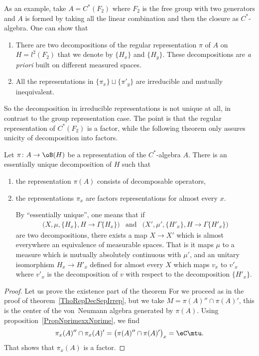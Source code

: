 As an example, take $A=C^*(F_2)$ where $F_2$ is the free group with two generators and $A$ is formed by taking all the linear combination and then the closure as $C^*$-algebra. One can show that
\begin{enumerate}
	\item There are two decompositions of the regular representation $\pi$ of $A$ on $H=l^2(F_2)$ that we denote by $\{ H_x \}$ and $\{ H_y \}$. These decompositions are \emph{a priori} built on different measured spaces.
	\item All the representations in $\{ \pi_x \}\sqcup\{ \pi'_y \}$ are irreducible and mutually inequivalent.
\end{enumerate}
So the decomposition in irreducible representations is not unique at all, in contrast to the group representation case. The point is that the regular representation of $C^*(F_2)$ is a factor, while the following theorem only assures unicity of decomposition into factors.

\begin{theorem}
	Let $\pi\colon A\to \oB(H)$ be a representation of the $C^*$-algebra $A$. There is an essentially unique decomposition of $H$ such that
	\begin{enumerate}
		\item the representation $\pi(A)$ consists of decomposable operators,
		\item the representations $\pi_x$ are factors representations for almost every $x$.

		By ``essentially unique'', one means that if
		\begin{align}
			\big( X,\mu,\{ H_x \}, H\to\Gamma\{ H_x \} \big)&\text{and}&\big( X',\mu',\{ H'_x \}, H\to\Gamma\{ H'_x \} \big)
		\end{align}
		are two decompositions, there exists a map $X\to X'$ which is almost everywhere an equivalence of measurable spaces. That is it maps $\mu$ to a measure which is mutually absolutely continuous with $\mu'$, and an unitary isomorphism $H_x\to H'_x$ defined for almost every $X$ which maps $v_x$ to $v'_x$ where $v'_x$ is the decomposition of $v$ with respect to the decomposition $\{ H'_x \}$.
	\end{enumerate}
\end{theorem}

\begin{proof}
	Let us prove the existence part of the theorem For we proceed as in the proof of theorem~\ref{ThoRepDecSepIrrep}, but we take $M=\pi(A)''\cap\pi(A)'$, this is the center of the von~Neumann algebra generated by $\pi(A)$. Using proposition~\ref{PropNprimexxNprime}, we find
	\begin{equation}
		\pi_x(A)''\cap\pi_x(A)'=\big( \pi(A)''\cap\pi(A)' \big)_x=\eC\mtu.
	\end{equation}
	That shows that $\pi_x(A)$ is a factor.
\end{proof}

